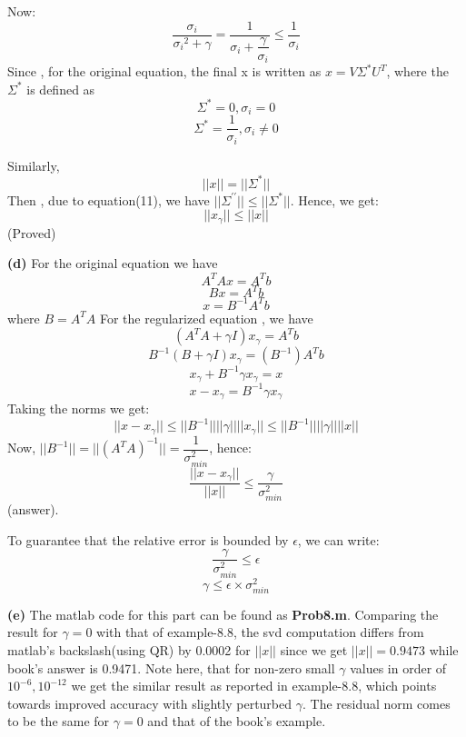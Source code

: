 \documentclass{article}
\renewcommand\part[1]{\vspace{.10in}\textbf{(#1)}}
\begin{document}
 Now:
 \begin{equation}
 \dfrac{\sigma_i}{{\sigma_i}^2 + \gamma} = \dfrac{1}{\sigma_i + \dfrac{\gamma}{\sigma_i}} \leq \dfrac{1}{\sigma_i}
\end{equation}
 Since , for the original equation, the final x is written as $x=V\Sigma^*U^T$, where the $\Sigma^*$ is defined as 
 \[\Sigma^* = 0 , \sigma_i = 0\]
 \[\Sigma^* = \dfrac{1}{\sigma_i} , \sigma_i \neq 0\]

 Similarly,
 \[||x|| = ||\Sigma^*||\]
 Then , due to equation(11), we have $||\Sigma^{\prime\prime}|| \leq ||\Sigma^*||$. Hence, we get:
 \begin{equation}
	 ||x_\gamma|| \leq ||x||
 \end{equation}
 (Proved)

 \part{d}
	 For the original equation we have 
	 \[A^TAx = A^Tb\]
	 \[Bx = A^Tb\]
	 \[x = B^{-1}A^Tb\]
	where $B = A^TA$
	 For the regularized equation , we have
	 \[(A^TA + \gamma I)x_\gamma = A^Tb\]
	 \[ B^{-1}(B + \gamma I)x_\gamma = (B^{-1})A^Tb\]
	 \[ x_\gamma + B^{-1}\gamma x_\gamma = x\]
	 \begin{equation}
	  x - x_\gamma = B^{-1}\gamma x_\gamma
	\end{equation}
	Taking the norms we get:
	\[||x - x_\gamma|| \leq ||B^{-1}||||\gamma||||x_\gamma|| \leq ||B^{-1}||||\gamma||||x||\]
	Now, $||B^{-1}|| = ||(A^TA)^{-1}|| =  \dfrac{1}{\sigma_{min}^2}$, hence:
	\[\dfrac{||x - x_\gamma||}{||x||} \leq \dfrac{\gamma}{\sigma_{min}^2}\]
	(answer). \newline

	To guarantee that the relative error is bounded by $\epsilon$, we can write: \newline
	\[ \dfrac{\gamma}{\sigma_{min}^2} \leq \epsilon \]
	\[ \gamma \leq \epsilon \times \sigma_{min}^2 \]


\part{e}
   The matlab code for this part can be found as \textbf {Prob8.m}. Comparing the result for $\gamma = 0$ with that of example-8.8, the svd computation differs from matlab's backslash(using QR) by 0.0002 for $||x||$ since we get $||x||=0.9473$ while book's answer is 0.9471. Note here, that for non-zero small $\gamma$ values in order of $10^{-6}, 10^{-12}$ we get the similar result as reported in example-8.8, which points towards improved accuracy with slightly perturbed $\gamma$. The residual norm comes to be the same for $\gamma=0$ and that of the book's example. \newline
\end{document}
